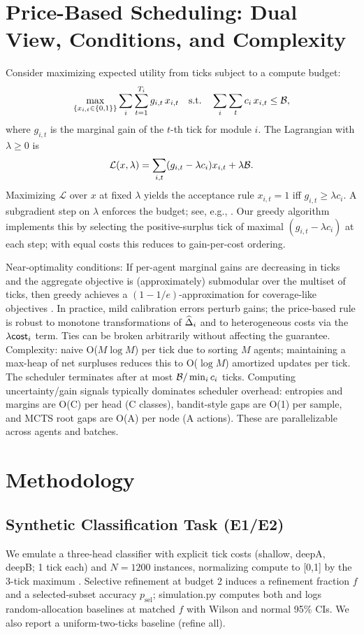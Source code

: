 \section{Price-Based Scheduling: Dual View, Conditions, and Complexity}
\label{sec:dual}
Consider maximizing expected utility from ticks subject to a compute budget:
\[
\max_{\{x_{i,t}\in\{0,1\}\}} \sum_{i} \sum_{t=1}^{T_i} g_{i,t} \, x_{i,t}
\quad\text{s.t.}\quad \sum_{i} \sum_{t} c_i \, x_{i,t} \le \mathcal{B},
\]
where $g_{i,t}$ is the marginal gain of the $t$-th tick for module $i$. The Lagrangian with $\lambda\ge 0$ is
\[
\mathcal{L}(x,\lambda) = \sum_{i,t} (g_{i,t}-\lambda c_i) x_{i,t} + \lambda \mathcal{B}.
\]
Maximizing $\mathcal{L}$ over $x$ at fixed $\lambda$ yields the acceptance rule $x_{i,t}=1$ iff $g_{i,t} \ge \lambda c_i$. A subgradient step on $\lambda$ enforces the budget; see, e.g., \cite{BoydVandenberghe2004}. Our greedy algorithm implements this by selecting the positive-surplus tick of maximal $(g_{i,t}-\lambda c_i)$ at each step; with equal costs this reduces to gain-per-cost ordering.

Near-optimality conditions: If per-agent marginal gains are decreasing in ticks and the aggregate objective is (approximately) submodular over the multiset of ticks, then greedy achieves a $(1-1/e)$-approximation for coverage-like objectives \cite{Nemhauser1978}. In practice, mild calibration errors perturb gains; the price-based rule is robust to monotone transformations of $\widehat{\Delta}_i$ and to heterogeneous costs via the $\lambda \mathsf{cost}_i$ term. Ties can be broken arbitrarily without affecting the guarantee. Complexity: naive O($M\log M$) per tick due to sorting $M$ agents; maintaining a max-heap of net surpluses reduces this to O($\log M$) amortized updates per tick. The scheduler terminates after at most $\mathcal{B}/\min_i c_i$ ticks. Computing uncertainty/gain signals typically dominates scheduler overhead: entropies and margins are O(C) per head (C classes), bandit-style gaps are O(1) per sample, and MCTS root gaps are O(A) per node (A actions). These are parallelizable across agents and batches.

\section{Methodology}
\label{sec:method}
\subsection{Synthetic Classification Task (E1/E2)}
We emulate a three-head classifier with explicit tick costs (shallow, deepA, deepB; 1 tick each) and $N{=}1200$ instances, normalizing compute to [0,1] by the 3-tick maximum \cite{Huang2018MSDNet,Wang2018SkipNet}. Selective refinement at budget 2 induces a refinement fraction $f$ and a selected-subset accuracy $p_{\mathrm{sel}}$; simulation.py computes both and logs random-allocation baselines at matched $f$ with Wilson and normal 95\% CIs. We also report a uniform-two-ticks baseline (refine all).

